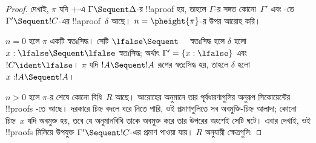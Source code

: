 \documentclass[../../../include/open-logic-section]{subfiles}
\begin{document}
\begin{proof}
  দেখাই, $\pi$ যদি +\Cut-এ
  $\Gamma \Sequent \Delta$-র !!a{proof} হয়,
  তাহলে $\Gamma$-র সঙ্গত কোনো~$\Gamma'$ এবং
  -তে $\Gamma' \Sequent !C$-এর
  !!a{proof}~$\delta$ আছে। $n = \pheight{\pi}$-র
  উপর আরোহ করি।

  $n = 0$ হলে $\pi$ একটি স্বতঃসিদ্ধ। সেটি
  $\lfalse \Sequent \quad$ স্বতঃসিদ্ধ হলে
  $\delta$ হলো $x:\lfalse \Sequent \lfalse$
  স্বতঃসিদ্ধ; অর্থাৎ $\Gamma' = \{x:\lfalse\}$
  এবং $!C \ident \lfalse$। $\pi$ যদি
  $!A \Sequent !A$ রূপের স্বতঃসিদ্ধ হয়,
  তাহলে $\delta$ হলো $x: !A \Sequent !A$।

  $n>0$ হলে $\pi$-র শেষে কোনো বিধি~$R$ আছে।
  আরোহের অনুমানে তার পূর্বধারণাগুলির
  অনুরূপ সিকোয়েন্টের !!{proof}s -তে
  আছে। দরকারে চিহ্ন বদলে ধরে নিতে পারি,
  ওই প্রমাণগুলিতে সব অবমুক্তি-চিহ্ন আলাদা;
  কোনো চিহ্ন~$x$ যদি অবমুক্ত হয়, তবে যে
  অনুমানবিধি তাকে অবমুক্ত করে তার উপরের
  অংশেই সেটি ঘটে। এবার দেখাই, ওই !!{proof}s
  মিলিয়ে উপযুক্ত $\Gamma' \Sequent !C$-এর
  প্রমাণ পাওয়া যায়। $R$ অনুযায়ী ক্ষেত্রগুলি:


\end{proof}
\end{document}
